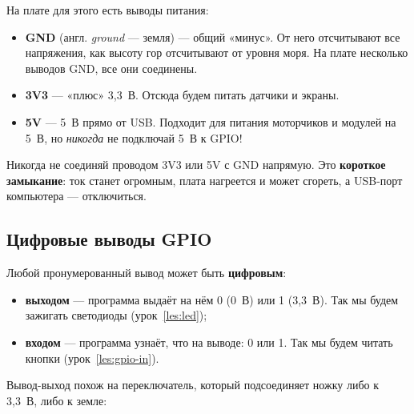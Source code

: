 На плате для этого есть выводы питания:
\begin{itemize}
  \item \textbf{GND} (англ. \emph{ground} --- земля) --- общий «минус». От него отсчитывают все напряжения,
        как высоту гор отсчитывают от уровня моря. На плате несколько выводов GND, все они соединены.
  \item \textbf{3V3} --- «плюс» 3,3~В. Отсюда будем питать датчики и экраны.
  \item \textbf{5V} --- 5~В прямо от USB. Подходит для питания моторчиков и модулей на 5~В, но
        \emph{никогда} не подключай 5~В к GPIO!
\end{itemize}

\begin{caution}
Никогда не соединяй проводом 3V3 или 5V с GND напрямую. Это \textbf{короткое замыкание}: ток станет
огромным, плата нагреется и может сгореть, а USB-порт компьютера --- отключиться.
\end{caution}

\subsection{Цифровые выводы GPIO}

Любой пронумерованный вывод может быть \textbf{цифровым}:
\begin{itemize}
  \item \textbf{выходом} --- программа выдаёт на нём 0 (0~В) или 1 (3,3~В). Так мы будем зажигать
        светодиоды (урок~\ref{les:led});
  \item \textbf{входом} --- программа узнаёт, что на выводе: 0 или 1. Так мы будем читать кнопки
        (урок~\ref{les:gpio-in}).
\end{itemize}

Вывод-выход похож на переключатель, который подсоединяет ножку либо к 3,3~В, либо к земле:

